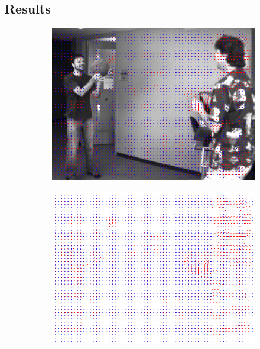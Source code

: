 \documentclass[a4paper,11]{article}
\begin{document}
  \subsection{Results}
\begin{figure}[H]
  \begin{subfigure}{0.5\textwidth}
   \centering
   \includegraphics[width=0.8\linewidth]{Basketball/result_31x31.png}
  \end{subfigure}
  \begin{subfigure}{0.5\textwidth}
   \centering
   \includegraphics[width=0.8\linewidth]{Basketball/flow_31x31.png}
  \end{subfigure}
  \vspace{1em}
  

\end{figure}
\end{document}
